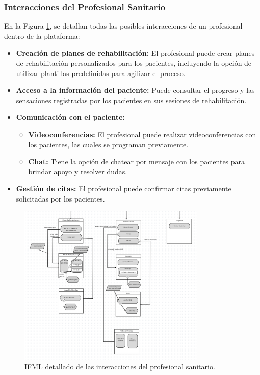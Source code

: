 \documentclass{article}
\begin{document}
\subsubsection{Interacciones del Profesional Sanitario}

En la Figura \ref{fig:ifml_profesional}, se detallan todas las posibles interacciones de un profesional dentro de la plataforma:

\begin{itemize}
	\item \textbf{Creación de planes de rehabilitación:} El profesional puede crear planes de rehabilitación personalizados para los pacientes, incluyendo la opción de utilizar plantillas predefinidas para agilizar el proceso.
	\item \textbf{Acceso a la información del paciente:} Puede consultar el progreso y las sensaciones registradas por los pacientes en sus sesiones de rehabilitación.
	\item \textbf{Comunicación con el paciente:} 
	\begin{itemize}
		\item \textbf{Videoconferencias:} El profesional puede realizar videoconferencias con los pacientes, las cuales se programan previamente.
		\item \textbf{Chat:} Tiene la opción de chatear por mensaje con los pacientes para brindar apoyo y resolver dudas.
	\end{itemize}
	\item \textbf{Gestión de citas:} El profesional puede confirmar citas previamente solicitadas por los pacientes.
\end{itemize}

\begin{figure}[H]
	\centering
	\includegraphics[width=0.8\textwidth]{images/ifml_profesional.png}
	\caption{IFML detallado de las interacciones del profesional sanitario.}
	\label{fig:ifml_profesional}
\end{figure}
\end{document}
